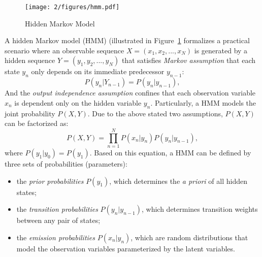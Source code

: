 \begin{figure}[htb]
\centering
\texttt{[image: 2/figures/hmm.pdf]}
\caption{Hidden Markov Model}
\label{fig:2-hmm}
\end{figure}
A hidden Markov model (HMM) (illustrated in Figure~\ref{fig:2-hmm} formalizes a practical scenario where an observable sequence $X=(x_1,x_2,...,x_N)$ is generated by a hidden sequence $Y = (y_1,y_2,...,y_N)$ that satisfies {\it Markov assumption} \cite{gardiner1985handbook} that each state $y_n$ only depends on its immediate predecessor $y_{n-1}$:
\begin{equation}\label{eq:2-mp}
P(y_n|Y_{n-1}) = P(y_n|y_{n-1}),
\end{equation}
And the {\it output independence assumption} confines that each observation variable $x_n$ is dependent only on the hidden variable $y_n$. Particularly, a HMM models the joint probability $P(X,Y)$. Due to the above stated two assumptions, $P(X,Y)$ can be factorized as:
\begin{equation}\label{eq:2-hmm}
P(X,Y) = \prod_{n=1}^N P(x_n|y_n)P(y_n|y_{n-1}),
\end{equation}
where $P(y_1|y_0)=P(y_1)$. Based on this equation, a HMM can be defined by three sets of probabilities (parameters):
\begin{itemize}
\item the {\it prior probabilities} $P(y_1)$, which determines the {\it a priori} of all hidden states;
\item the {\it transition probabilities} $P(y_n|y_{n-1})$, which determines transition weights between any pair of states;
\item the {\it emission probabilities} $P(x_n|y_n)$, which are random distributions that model the observation variables parameterized by the latent variables.
\end{itemize}


